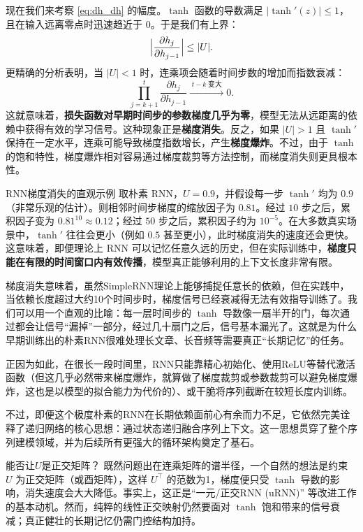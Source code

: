 现在我们来考察 \eqref{eq:dh_dh} 的幅度。$\tanh$ 函数的导数满足 $|\tanh'(z)| \le 1$，且在输入远离零点时迅速趋近于 0。于是我们有上界：
\[
\Bigl|\frac{\partial h_j}{\partial h_{j-1}}\Bigr| \le |U|.
\]
更精确的分析\cite{bengio1994learning}表明，当 $|U| < 1$ 时，连乘项会随着时间步数的增加而指数衰减：
\[
\prod_{j=k+1}^t \frac{\partial h_j}{\partial h_{j-1}} \xrightarrow{\;t-k\;\text{变大}\;} 0.
\]
这就意味着，\textbf{损失函数对早期时间步的参数梯度几乎为零}，模型无法从远距离的依赖中获得有效的学习信号。这种现象正是\textbf{梯度消失}。反之，如果 $|U| > 1$ 且 $\tanh'$ 保持在一定水平，连乘可能导致梯度指数增长，产生\textbf{梯度爆炸}。不过，由于 $\tanh$ 的饱和特性，梯度爆炸相对容易通过梯度裁剪等方法控制，而梯度消失则更具根本性。

\begin{example}{RNN梯度消失的直观示例}{}
取朴素 RNN，$U = 0.9$，并假设每一步 $\tanh'$ 均为 $0.9$（非常乐观的估计）。则相邻时间步梯度的缩放因子为 $0.81$。经过 $10$ 步之后，累积因子变为 $0.81^{10} \approx 0.12$；经过 $50$ 步之后，累积因子约为 $10^{-5}$。在大多数真实场景中，$\tanh'$ 往往会更小（例如 $0.5$ 甚至更小），此时梯度消失的速度还会更快。
这意味着，即便理论上 RNN 可以记忆任意久远的历史，但在实际训练中，\textbf{梯度只能在有限的时间窗口内有效传播}，模型真正能够利用的上下文长度非常有限。
\end{example}

梯度消失意味着，虽然SimpleRNN理论上能够捕捉任意长的依赖，但在实践中，当依赖长度超过大约10个时间步时，梯度信号已经衰减得无法有效指导训练了\cite{bengio1994learning}。我们可以用一个直观的比喻：每一层时间步的 \(\tanh\) 导数像一扇半开的门，每次通过都会让信号“漏掉”一部分，经过几十扇门之后，信号基本漏光了。这就是为什么早期训练出的朴素RNN很难处理长文章、长音频等需要真正“长期记忆”的任务。

正因为如此，在很长一段时间里，RNN只能靠精心初始化、使用ReLU等替代激活函数（但这几乎必然带来梯度爆炸，就算做了梯度裁剪或参数裁剪可以避免梯度爆炸，这也是以模型的拟合能力为代价的）、或干脆将序列截断在较短长度内训练。

不过，即便这个极度朴素的RNN在长期依赖面前心有余而力不足，它依然完美诠释了递归网络的核心思想：通过状态递归融合序列上下文。这一思想贯穿了整个序列建模领域，并为后续所有更强大的循环架构奠定了基石。

\begin{framed}{能否让$U$是正交矩阵？}
既然问题出在连乘矩阵的谱半径，一个自然的想法是约束 \(U\) 为正交矩阵（或酉矩阵），这样 \(U^\top\) 的范数为1，梯度便只受 \(\tanh\) 导数的影响，消失速度会大大降低。事实上，这正是“一元/正交RNN (uRNN)” 等改进工作的基本动机。然而，纯粹的线性正交映射仍然要面对 \(\tanh\) 饱和带来的信号衰减；真正健壮的长期记忆仍需门控结构加持。
\end{framed}

